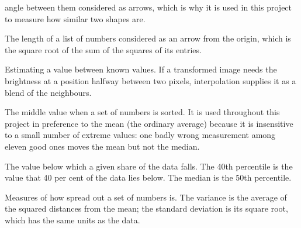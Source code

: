 \documentclass[11pt,a4paper,oneside]{report}
\begin{document}
\begin{description}[style=nextline,leftmargin=1.4em]
        angle between them considered as arrows, which is why it is used in
        this project to measure how similar two shapes are.
  \item[Norm] The length of a list of numbers considered as an arrow from the
        origin, which is the square root of the sum of the squares of its
        entries.
  \item[Interpolation] Estimating a value between known values. If a
        transformed image needs the brightness at a position halfway between
        two pixels, interpolation supplies it as a blend of the neighbours.
  \item[Median] The middle value when a set of numbers is sorted. It is used
        throughout this project in preference to the mean (the ordinary
        average) because it is insensitive to a small number of extreme
        values: one badly wrong measurement among eleven good ones moves the
        mean but not the median.
  \item[Percentile] The value below which a given share of the data falls.
        The 40th percentile is the value that 40 per cent of the data lies
        below. The median is the 50th percentile.
  \item[Variance and standard deviation] Measures of how spread out a set of
        numbers is. The variance is the average of the squared distances from
        the mean; the standard deviation is its square root, which has the
        same units as the data.
\end{description}
\end{document}

